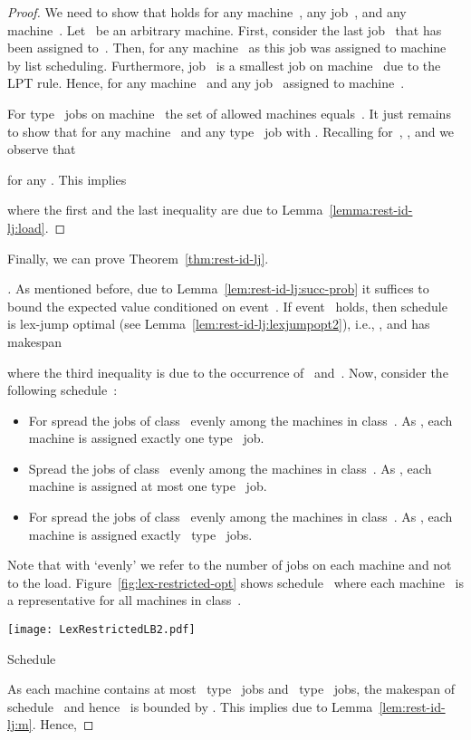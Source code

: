 \documentclass[a4paper,11pt,fleqn]{article}
\begin{document}
\begin{proof}
We need to show that  holds for any machine~, any job~, and any machine~. Let~ be an arbitrary machine. First, consider the last job~ that has been assigned to~. Then,  for any machine~ as this job was assigned to machine~ by list scheduling. Furthermore, job~ is a smallest job on machine~ due to the LPT rule. Hence,  for any machine~ and any job~ assigned to machine~.

For type~ jobs on machine~ the set of allowed machines equals~. It just remains to show that  for any machine~ and any type~ job  with . Recalling  for~, , and  we observe that

for any . This implies

where the first and the last inequality are due to Lemma~\ref{lemma:rest-id-lj:load}.
\end{proof}

Finally, we can prove Theorem~\ref{thm:rest-id-lj}.

\begin{proof}[]
As mentioned before, due to Lemma~\ref{lem:rest-id-lj:succ-prob} it suffices to bound the expected value conditioned on event~. If event~ holds, then schedule~ is lex-jump optimal (see Lemma~\ref{lem:rest-id-lj:lexjumpopt2}), i.e., , and has makespan

where the third inequality is due to the occurrence of~ and~. Now, consider the following schedule~:
\begin{itemize}

  \item For  spread the jobs of class~ evenly among the machines in class~. As , each machine is assigned exactly one type~ job.

  \item Spread the jobs of class~ evenly among the machines in class~. As , each machine is assigned at most one type~ job.

  \item For  spread the jobs of class~ evenly among the machines in class~. As , each machine is assigned exactly ~type~ jobs.

\end{itemize}
Note that with `evenly' we refer to the number of jobs on each machine and not to the load. Figure~\ref{fig:lex-restricted-opt} shows schedule~ where each machine~ is a representative for all machines in class~.

\begin{artclfig}\newcommand{\height}{12em}
  \texttt{[image: LexRestrictedLB2.pdf]}
  \caption{Schedule }
  \label{fig:lex-restricted-opt}
\end{artclfig}

As each machine contains at most ~type~ jobs and ~type~ jobs, the makespan of schedule~ and hence~ is bounded by . This implies  due to Lemma~\ref{lem:rest-id-lj:m}. Hence,

\end{proof}
\end{document}
